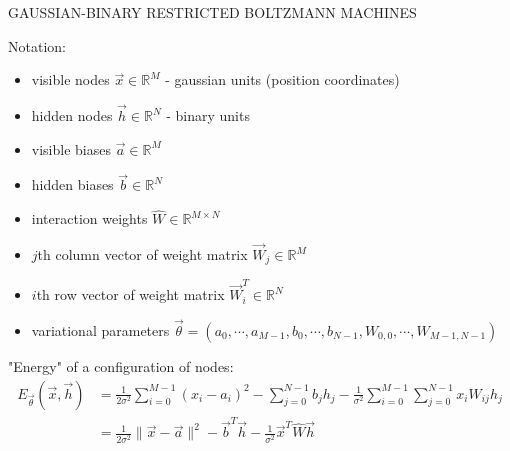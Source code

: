 \documentclass[12pt]{article}
\begin{document}
\begin{center}
\begin{large}
GAUSSIAN-BINARY RESTRICTED BOLTZMANN MACHINES
\end{large}
\end{center}

\noindent Notation:
\begin{itemize}
\item visible nodes $\vec{x}  \in \mathbb{R}^M$ - gaussian units (position coordinates)
\item hidden nodes $\vec{h} \in \mathbb{R}^N$ - binary units
\item visible biases $\vec{a} \in \mathbb{R}^M$
\item hidden biases $\vec{b} \in \mathbb{R}^N$
\item interaction weights $\hat{W} \in \mathbb{R}^{M\times N}$
\item $j$th column vector of weight matrix $\vec{W}_j \in \mathbb{R}^M$
\item $i$th row vector of weight matrix $\vec{W}_i^T \in \mathbb{R}^N$ 
\item variational parameters $\vec{\theta} = ( a_0, \cdots, a_{M-1},b_0,\cdots,b_{N-1}, W_{0,0},\cdots,W_{M-1,N-1} )$ \\
\end{itemize}

\noindent "Energy" of a configuration of nodes:
\begin{align*}
E_{\vec{\theta}}(\vec{x},\vec{h}) &= \frac{1}{2\sigma^2} \sum_{i=0}^{M-1}(x_i - a_i)^2 - \sum_{j=0}^{N-1} b_j h_j -
\frac{1}{\sigma^2} \sum_{i=0}^{M-1}\sum_{j=0}^{N-1} x_i W_{ij} h_j\\
&= \frac{1}{2\sigma^2} \| \vec{x} - \vec{a} \|^2 - \vec{b}^T \vec{h} - \frac{1}{\sigma^2}\vec{x}^T \hat{W} \vec{h}
\end{align*}
\end{document}
